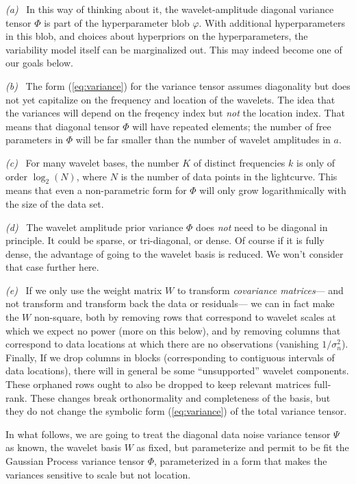 \documentclass[12pt,letterpaper]{article}
\newcommand{\variance}{\sigma^2}
\newcommand{\hyperpars}{\varphi}
\newcommand{\wavevec}{a}
\newcommand{\noisetensor}{\Psi}
\newcommand{\wavetensor}{\Phi}
\newcommand{\weightmatrix}{W}
\begin{document}
\textsl{(a)}~%
In this way of thinking about it, the wavelet-amplitude diagonal
variance tensor $\wavetensor$ is part of the hyperparameter blob
$\hyperpars$.
With additional hyperparameters in this blob,
and choices about hyperpriors on the hyperparameters,
the variability model itself can be marginalized out.
This may indeed become one of our goals below.

\textsl{(b)}~%
The form (\ref{eq:variance}) for the variance tensor assumes diagonality
but does not yet capitalize on the frequency and location of the wavelets.
The idea that the variances will depend on the freqency index but \emph{not} the location index.
That means that diagonal tensor $\wavetensor$ will have repeated elements;
the number of free parameters in $\wavetensor$
will be far smaller than the number of wavelet amplitudes in $\wavevec$.

\textsl{(c)}~%
For many wavelet bases, the number $K$ of distinct frequencies $k$ is only of order $\log_2(N)$,
where $N$ is the number of data points in the lightcurve.
This means that even a non-parametric form for $\wavetensor$
will only grow logarithmically with the size of the data set.

\textsl{(d)}~%
The wavelet amplitude prior variance $\wavetensor$ does \emph{not} need to be diagonal in principle.
It could be sparse, or tri-diagonal, or dense.
Of course if it is fully dense, the advantage of going to the wavelet basis is reduced.
We won't consider that case further here.

\textsl{(e)}~%
If we only use the weight matrix $\weightmatrix$ to transform \emph{covariance matrices}---%
and not transform and transform back the data or residuals---%
we can in fact make the $\weightmatrix$ non-square,
both by removing rows that correspond to wavelet scales at which we expect no power
(more on this below),
and by removing columns that correspond to data locations at which there are no observations
(vanishing $1/\variance_n$).
Finally, If we drop columns in blocks
(corresponding to contiguous intervals of data locations),
there will in general be some ``unsupported'' wavelet components.
These orphaned rows ought to also be dropped to keep relevant matrices full-rank.
These changes break orthonormality and completeness of the basis,
but they do not change the symbolic form (\ref{eq:variance}) of the total variance tensor.

In what follows,
we are going to treat the diagonal data noise variance tensor $\noisetensor$ as known,
the wavelet basis $\weightmatrix$ as fixed,
but parameterize and permit to be fit the Gaussian Process variance tensor $\wavetensor$,
parameterized in a form that makes the variances sensitive to scale but not location.
\end{document}
